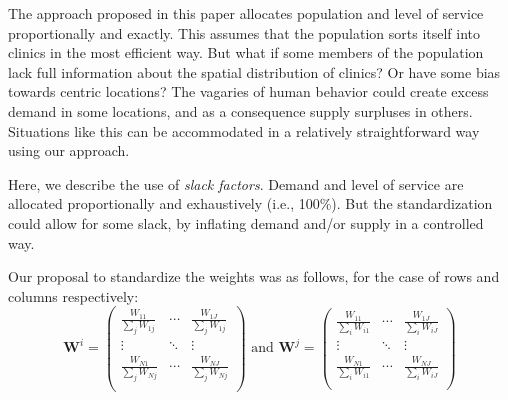 \documentclass[10pt,letterpaper]{article}
\begin{document}
The approach proposed in this paper allocates population and level of
service proportionally and exactly. This assumes that the population
sorts itself into clinics in the most efficient way. But what if some
members of the population lack full information about the spatial
distribution of clinics? Or have some bias towards centric locations?
The vagaries of human behavior could create excess demand in some
locations, and as a consequence supply surpluses in others. Situations
like this can be accommodated in a relatively straightforward way using
our approach.

Here, we describe the use of \emph{slack factors}. Demand and level of
service are allocated proportionally and exhaustively (i.e., 100\%). But
the standardization could allow for some slack, by inflating demand
and/or supply in a controlled way.

Our proposal to standardize the weights was as follows, for the case of
rows and columns respectively: \[
\mathbf{W}^{i} = \left(\begin{array}{ccc}
            \frac{W_{11}}{\sum_jW_{1j}} & \cdots & \frac{W_{1J}}{\sum_jW_{1j}}\\
            \vdots & \ddots & \vdots\\
            \frac{W_{N1}}{\sum_jW_{Nj}} & \cdots & \frac{W_{NJ}}{\sum_jW_{Nj}}\\
        \end{array}
        \right)
\text{  and  }
\mathbf{W}^{j} = \left(\begin{array}{ccc}
            \frac{W_{11}}{\sum_iW_{i1}} & \cdots & \frac{W_{1J}}{\sum_iW_{iJ}}\\
            \vdots & \ddots & \vdots\\
            \frac{W_{N1}}{\sum_iW_{i1}} & \cdots & \frac{W_{NJ}}{\sum_iW_{iJ}}\\
        \end{array}
        \right)
\]
\end{document}
